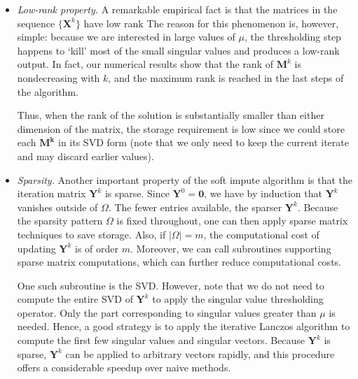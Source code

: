 \documentclass[conference,onecolumn,12pt]{IEEEtran}
\newcommand{\mtx}[1]{\bm{#1}}
\numberwithin{equation}{section}
\numberwithin{figure}{section}
\numberwithin{table}{section}
\theoremstyle{definition}
\begin{document}
  \begin{itemize}
  \item {\em Low-rank property.} A remarkable empirical fact is that the
    matrices in the sequence $\{\mtx{X}^k\}$ have low rank  The reason for this
    phenomenon is, however, simple: because we are interested in large
    values of $\mu$, the thresholding step happens to `kill' most of
    the small singular values and produces a low-rank output. In fact, our numerical results show that the rank of $\mtx{M}^{k}$
    is nondecreasing with $k$, and the maximum rank is reached in the
    last steps of the algorithm.
  
    Thus, when the rank of the solution is substantially smaller than
    either dimension of the matrix, the storage requirement is low since
    we could store each $\mtx{M^k}$ in its SVD form (note that we only
    need to keep the current iterate and may discard earlier
    values).
  
  \item {\em Sparsity.}  Another important property of the soft impute algorithm
    is that the iteration matrix $\mtx{Y}^k$ is sparse. Since
    $\mtx{Y}^0=\mtx{0}$, we have by induction that $\mtx{Y}^{k}$
    vanishes outside of $\Omega$. The fewer entries available, the
    sparser $\mtx{Y}^k$. Because the sparsity pattern $\Omega$ is fixed
    throughout, one can then apply sparse matrix techniques to save
    storage. Also, if $|\Omega| = m$, the computational cost of updating
    $\mtx{Y}^k$ is of order $m$. Moreover, we can call
    subroutines supporting sparse matrix computations, which can further
    reduce computational costs.
  
    One such subroutine is the SVD. However, note that we do not need to
    compute the entire SVD of $\mtx{Y}^k$ to apply the singular value
    thresholding operator. Only the part corresponding to singular
    values greater than $\mu$ is needed. Hence, a good strategy is to
    apply the iterative Lanczos algorithm to compute the first few
    singular values and singular vectors. Because $\mtx{Y}^k$ is sparse,
    $\mtx{Y}^k$ can be applied to arbitrary vectors rapidly, and this
    procedure offers a considerable speedup over naive methods.
  \end{itemize}
    
\end{document}
